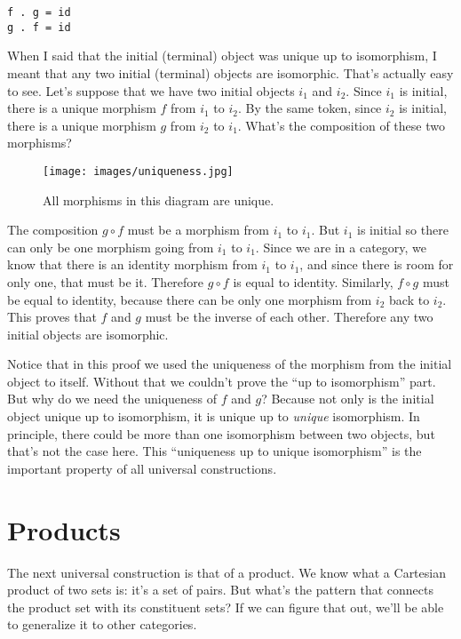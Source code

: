 \begin{Verbatim}
f . g = id
g . f = id
\end{Verbatim}
When I said that the initial (terminal) object was unique up to
isomorphism, I meant that any two initial (terminal) objects are
isomorphic. That's actually easy to see. Let's suppose that we have two
initial objects $i_{1}$ and $i_{2}$. Since
$i_{1}$ is initial, there is a unique morphism $f$ from
$i_{1}$ to $i_{2}$. By the same token, since
$i_{2}$ is initial, there is a unique morphism $g$ from
$i_{2}$ to $i_{1}$. What's the composition of
these two morphisms?

\begin{figure}[H]
\centering
\texttt{[image: images/uniqueness.jpg]}
\caption{All morphisms in this diagram are unique.}
\end{figure}

\noindent
The composition $g \circ f$ must be a morphism from $i_{1}$ to
$i_{1}$. But $i_{1}$ is initial so there can only
be one morphism going from $i_{1}$ to $i_{1}$.
Since we are in a category, we know that there is an identity morphism
from $i_{1}$ to $i_{1}$, and since there is room
for only one, that must be it. Therefore $g \circ f$ is equal to
identity. Similarly, $f \circ g$ must be equal to identity, because there
can be only one morphism from $i_{2}$ back to
$i_{2}$. This proves that $f$ and $g$ must be the
inverse of each other. Therefore any two initial objects are isomorphic.

Notice that in this proof we used the uniqueness of the morphism from
the initial object to itself. Without that we couldn't prove the ``up to
isomorphism'' part. But why do we need the uniqueness of $f$ and
$g$? Because not only is the initial object unique up to
isomorphism, it is unique up to \emph{unique} isomorphism. In principle,
there could be more than one isomorphism between two objects, but that's
not the case here. This ``uniqueness up to unique isomorphism'' is the
important property of all universal constructions.

\section{Products}

The next universal construction is that of a product. We know what a
Cartesian product of two sets is: it's a set of pairs. But what's the
pattern that connects the product set with its constituent sets? If we
can figure that out, we'll be able to generalize it to other categories.

